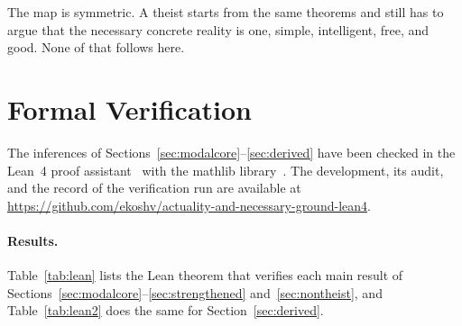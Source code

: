 \documentclass[11pt,letterpaper]{article}
\theoremstyle{plain}
\theoremstyle{definition}
\begin{document}
The map is symmetric. A theist starts from the same theorems and still has to argue that the necessary concrete reality is one, simple, intelligent, free, and good. None of that follows here.

\section{Formal Verification}
\label{sec:formal}

The inferences of Sections~\ref{sec:modalcore}--\ref{sec:derived} have been checked in the Lean~4 proof assistant~\cite{lean4} with the mathlib library~\cite{mathlib}. The development, its audit, and the record of the verification run are available at \url{https://github.com/ekoshv/actuality-and-necessary-ground-lean4}.

\paragraph{Results.} Table~\ref{tab:lean} lists the Lean theorem that verifies each main result of Sections~\ref{sec:modalcore}--\ref{sec:strengthened} and~\ref{sec:nontheist}, and Table~\ref{tab:lean2} does the same for Section~\ref{sec:derived}.
\end{document}
